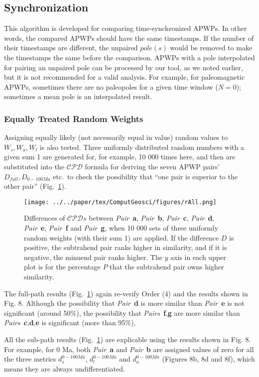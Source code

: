 \subsection{Synchronization}
This algorithm is developed for comparing time-synchronized APWPs. In other
words, the compared APWPs should have the same timestamps. If the number of
their timestamps are different, the unpaired $pole(s)$ would be removed to make
the timestamps the same before the comparison. APWPs with a pole interpolated
for pairing an unpaired pole can be processed by our tool, as we noted earlier,
but it is not recommended for a valid analysis. For example, for paleomagnetic
APWPs, sometimes there are no paleopoles for a given time window ($N=0$);
sometimes a mean pole is an interpolated result.

\subsubsection{Equally Treated Random Weights}
Assigning equally likely (not necessarily equal in value) random values to
$W_s,W_a,W_l$ is also tested. Three uniformly distributed random numbers with a
given sum 1 are generated for, for example, 10 000 times here, and then are
substituted into the $\mathcal{CPD}$ formula for deriving the seven APWP
pairs' $D_{full},D_{0-100Ma}$ etc.\ to check the possibility that ``one pair is
superior to the other pair'' (Fig.~\ref{fig:rall}).

\begin{figure}[tbp]
\centering
\texttt{[image: ../../paper/tex/ComputGeosci/figures/rAll.png]}
\caption[Comparisons of Pairs a-g with random weights involved]{Differences of
$\mathcal{CPD}s$ between \emph{Pair}~\textbf{a}, \emph{Pair}~\textbf{b},
\emph{Pair}~\textbf{c}, \emph{Pair}~\textbf{d}, \emph{Pair}~\textbf{e},
\emph{Pair}~\textbf{f} and \emph{Pair}~\textbf{g}, when 10 000 sets of three
uniformly random weights (with
their sum 1) are applied. If the difference $D$ is positive, the subtrahend pair
ranks higher in similarity, and if it is negative, the minuend pair ranks
higher. The $y$ axis in each upper plot is for the percentage $P$ that the
subtrahend pair owns higher similarity.}\label{fig:rall}
\end{figure}

The full-path results (Fig.~\ref{fig:rall}) again re-verify Order (4) and
the results shown in Fig. 8. Although the possibility that
\emph{Pair}~\textbf{d} is more similar than \emph{Pair}~\textbf{e} is not
significant (around 50\%), the possibility that
\emph{Pairs}~\textbf{f},\textbf{g} are more similar than
\emph{Pairs}~\textbf{c},\textbf{d},\textbf{e} is significant (more than 95\%),

All the sub-path results (Fig.~\ref{fig:rall}) are explicable using the results
shown in Fig. 8. For example, for 0 Ma, both
\emph{Pair}~\textbf{a} and \emph{Pair}~\textbf{b} are assigned values of zero
for all the three metrics $d_s^{0-100Ma}$, $d_l^{0-100Ma}$ and $d_a^{0-100Ma}$
(Figures 8b, 8d and 8f), which means they are always undifferentiated.
